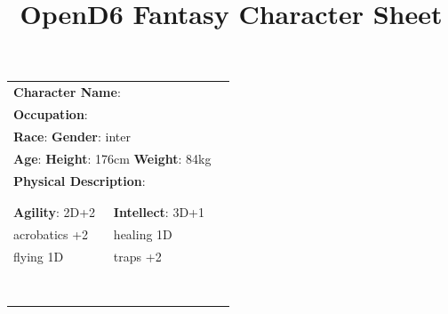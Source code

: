 \documentclass[10pt]{article}
\title{OpenD6 Fantasy Character Sheet}
\begin{document}
\pagestyle{fancy}
\fancyhf{}
\fancyfoot[R]{\thepage}
\renewcommand{\headrulewidth}{0pt}


\cleardoublepage
\begin{table}
\begin{tabular}{m{156pt} m{156pt} m{156pt}}
    \multicolumn{2}{l}{\textbf{Character Name}:  \hrulefill} \\
    \multicolumn{2}{l}{\textbf{Occupation}:  \hrulefill} \\
    \multicolumn{2}{l}{\textbf{Race}:  \hrulefill \hspace{1em} \textbf{Gender}: inter \hrulefill} \\
    \multicolumn{2}{l}{\textbf{Age}:  \hrulefill \hspace{1em} \textbf{Height}: 176cm \hrulefill \hspace{1em}  \textbf{Weight}: 84kg \hrulefill } \\
    \multicolumn{2}{l}{\textbf{Physical Description}:  \hrulefill } \\
    \multicolumn{2}{l}{ \hrulefill } \\
 & & \\
\textbf{Agility}: 2D+2 \hrulefill      & \textbf{Intellect}: 3D+1 \hrulefill  &                             \\

acrobatics        +2 \hrulefill & healing           1D \hrulefill & \\

flying            1D \hrulefill & traps             +2 \hrulefill & \\

 \hrulefill &  \hrulefill & \\

 \hrulefill &  \hrulefill & \\

 \hrulefill &  \hrulefill & \\

 \hrulefill &  \hrulefill & \\

 \hrulefill &  \hrulefill & \\

 \hrulefill &  \hrulefill & \\

 \hrulefill &  \hrulefill & \\

 \hrulefill &  \hrulefill & \\


\end{tabular}
\end{table}
\end{document}
